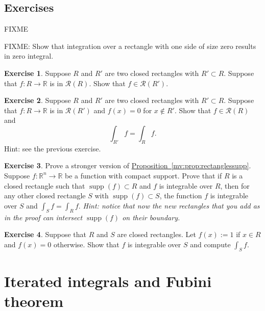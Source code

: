 \documentclass[12pt]{book}
\newcommand{\R}{{\mathbb{R}}}
\newcommand{\sR}{{\mathcal{R}}}
\newcommand{\sectionnewpage}{\clearpage}
\theoremstyle{plain}
\theoremstyle{remark}
\theoremstyle{definition}
\theoremstyle{exercise}
\newtheorem{exercise}{Exercise}[section]
\theoremstyle{example}
\newcommand{\propref}[1]{\hyperref[#1]{Proposition~\ref*{#1}}}
\begin{document}
\subsection{Exercises}

FIXME

FIXME: Show that integration over a rectangle with one side of size
zero results in zero integral.

\begin{exercise} \label{mv:exersmallerset}
Suppose $R$ and $R'$ are two closed rectangles with $R' \subset R$.  Suppose
that $f \colon R \to \R$ is in $\sR(R)$.  Show that $f \in \sR(R')$.
\end{exercise}

\begin{exercise} \label{mv:zerooutside}
Suppose $R$ and $R'$ are two closed rectangles with $R' \subset R$.  Suppose
that $f \colon R \to \R$ is in $\sR(R')$ and $f(x) = 0$ for $x \notin R'$.
Show that $f \in \sR(R)$ and
\begin{equation*}
\int_{R'} f = \int_R f .
\end{equation*}
Hint: see the previous exercise.
\end{exercise}

\begin{exercise}
Prove a stronger version of \propref{mv:prop:rectanglessupp}.
Suppose $f \colon \R^n \to \R$ be a function with compact support.
Prove that
if $R$ is a closed rectangle such that $\operatorname{supp}(f) \subset R$
and $f$ is integrable over $R$, then for any other closed rectangle
$S$ with $\operatorname{supp}(f) \subset S$,
the function $f$ is integrable over $S$ and
$\int_S f = \int_R f$.
\emph{Hint: notice that now the new rectangles that you add as in the proof
can intersect $\operatorname{supp}(f)$ on their boundary.}
\end{exercise}

\begin{exercise}
Suppose that $R$ and $S$ are closed rectangles.  Let $f(x) := 1$ if 
$x \in R$ and $f(x) = 0$ otherwise.  Show that $f$ is integrable over $S$
and compute $\int_S f$.
\end{exercise}


\sectionnewpage
\section{Iterated integrals and Fubini theorem}
\label{sec:iteratedints}
\end{document}
